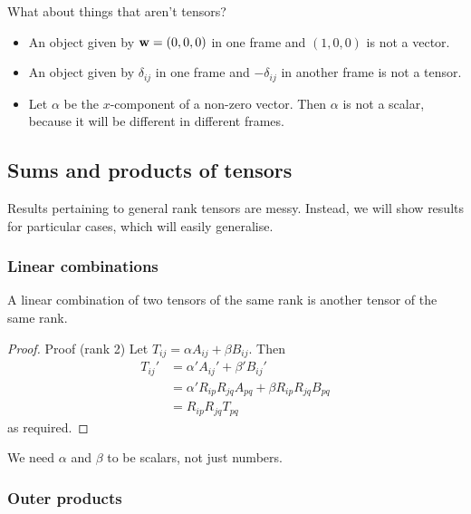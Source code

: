 \documentclass{../../template/note}
\begin{document}
    What about things that aren't tensors?

    \begin{itemize}
        \item An object given by \(\V w = (0, 0, 0)\) in one frame and \((1, 0, 0)\) is not a vector.
        \item An object given by \(\delta_{ij}\) in one frame and \(-\delta_{ij}\) in another frame is not a tensor.
        \item Let \(\alpha\) be the \(x\)-component of a non-zero vector. Then \(\alpha\) is not a scalar, because it will be different in different frames.
    \end{itemize}
    
    \subsection{Sums and products of tensors}

    Results pertaining to general rank tensors are messy. Instead, we will show results for particular cases, which will easily generalise.

    \subsubsection{Linear combinations}

    \begin{proposition*}
        A linear combination of two tensors of the same rank is another tensor of the same rank.
    \end{proposition*}
    
    \begin{proof}{Proof (rank 2)}
        Let \(T_{ij} = \alpha A_{ij} + \beta B_{ij}\). Then
        \begin{align*}
            T_{ij}' &= \alpha' A_{ij}' + \beta' B_{ij}' \\
            &= \alpha' R_{ip} R_{jq} A_{pq} + \beta R_{ip} R_{jq} B_{pq} \\
            &= R_{ip} R_{jq} T_{pq}
        \end{align*}
        as required.        
    \end{proof}
    
    \begin{remark*}
        We need \(\alpha\) and \(\beta\) to be scalars, not just numbers.
    \end{remark*}
    
    \subsubsection{Outer products}
\end{document}
